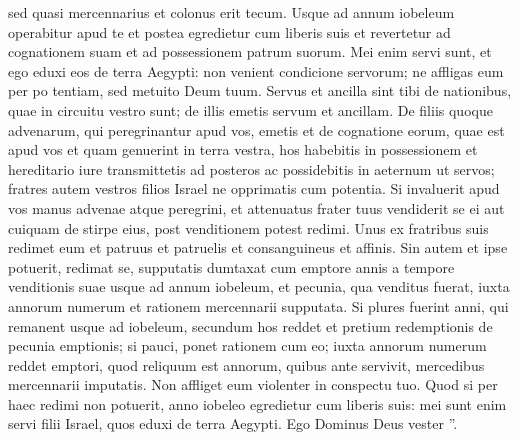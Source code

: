 \begin{biblechapter}
\begin{biblechapter}
\begin{biblechapter}
\begin{biblechapter}
\begin{biblechapter}
\begin{biblechapter}
\begin{biblechapter}
\begin{biblechapter}
\begin{biblechapter}
\begin{biblechapter}
\begin{biblechapter}
\begin{biblechapter}
\begin{biblechapter}
\begin{biblechapter}
\begin{biblechapter}
\begin{biblechapter}
\begin{biblechapter}
\begin{biblechapter}
\begin{biblechapter}
\begin{biblechapter}
\begin{biblechapter}
\begin{biblechapter}
\begin{biblechapter}
\begin{biblechapter}
\begin{biblechapter}
\verse sed quasi mercennarius et colonus erit tecum. Usque ad annum iobeleum operabitur apud te 
\verse et postea egredietur cum liberis suis et revertetur ad cognationem suam et ad possessionem patrum suorum. 
\verse Mei enim servi sunt, et ego eduxi eos de terra Aegypti: non venient condicione servorum; 
\verse ne affligas eum per po tentiam, sed metuito Deum tuum. 
\verse Servus et ancilla sint tibi de nationibus, quae in circuitu vestro sunt; de illis emetis servum et ancillam. 
\verse De filiis quoque advenarum, qui peregrinantur apud vos, emetis et de cognatione eorum, quae est apud vos et quam genuerint in terra vestra, hos habebitis in possessionem 
\verse et hereditario iure transmittetis ad posteros ac possidebitis in aeternum ut servos; fratres autem vestros filios Israel ne opprimatis cum potentia.
 \verse Si invaluerit apud vos manus advenae atque peregrini, et attenuatus frater tuus vendiderit se ei aut cuiquam de stirpe eius, 
\verse post venditionem potest redimi. Unus ex fratribus suis redimet eum 
\verse et patruus et patruelis et consanguineus et affinis. Sin autem et ipse potuerit, redimat se, 
\verse supputatis dumtaxat cum emptore annis a tempore venditionis suae usque ad annum iobeleum, et pecunia, qua venditus fuerat, iuxta annorum numerum et rationem mercennarii supputata. 
\verse Si plures fuerint anni, qui remanent usque ad iobeleum, secundum hos reddet et pretium redemptionis de pecunia emptionis; 
 \verse si pauci, ponet rationem cum eo; iuxta annorum numerum reddet emptori, quod reliquum est annorum, 
\verse quibus ante servivit, mercedibus mercennarii imputatis. Non affliget eum violenter in conspectu tuo.
 \verse Quod si per haec redimi non potuerit, anno iobeleo egredietur cum liberis suis: 
\verse mei sunt enim servi filii Israel, quos eduxi de terra Aegypti. Ego Dominus Deus vester ”.
 

\end{biblechapter}
\end{biblechapter}
\end{biblechapter}
\end{biblechapter}
\end{biblechapter}
\end{biblechapter}
\end{biblechapter}
\end{biblechapter}
\end{biblechapter}
\end{biblechapter}
\end{biblechapter}
\end{biblechapter}
\end{biblechapter}
\end{biblechapter}
\end{biblechapter}
\end{biblechapter}
\end{biblechapter}
\end{biblechapter}
\end{biblechapter}
\end{biblechapter}
\end{biblechapter}
\end{biblechapter}
\end{biblechapter}
\end{biblechapter}
\end{biblechapter}

